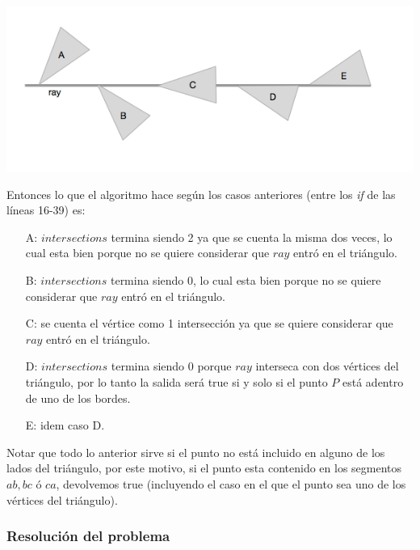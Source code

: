 \centerline{\includegraphics[scale=0.7]{img/ej36.png}}

Entonces lo que el algoritmo hace según los casos anteriores (entre los \textit{if} de las líneas 16-39) es:
\begin{itemize}
\item[A:] $intersections$ termina siendo 2 ya que se cuenta la misma dos veces, lo cual esta bien porque
no se quiere considerar que $ray$ entró en el triángulo.
\item[B:] $intersections$ termina siendo 0, lo cual esta bien porque
no se quiere considerar que $ray$ entró en el triángulo.
\item[C:] se cuenta el vértice como 1 intersección ya que se quiere considerar que $ray$ entró en el triángulo.
\item[D:] $intersections$ termina siendo 0 porque $ray$ interseca con dos vértices del triángulo, por lo
tanto la salida será true si y solo si el punto $P$ está adentro de uno de los bordes.
\item[E:] idem caso D.
\end{itemize}

Notar que todo lo anterior sirve si el punto no está incluido en alguno de los lados del triángulo, por este
motivo, si el punto esta contenido en los segmentos $ab, bc$ ó $ca$, devolvemos true (incluyendo el caso
en el que el punto sea uno de los vértices del triángulo).

\subsubsection*{Resolución del problema}


